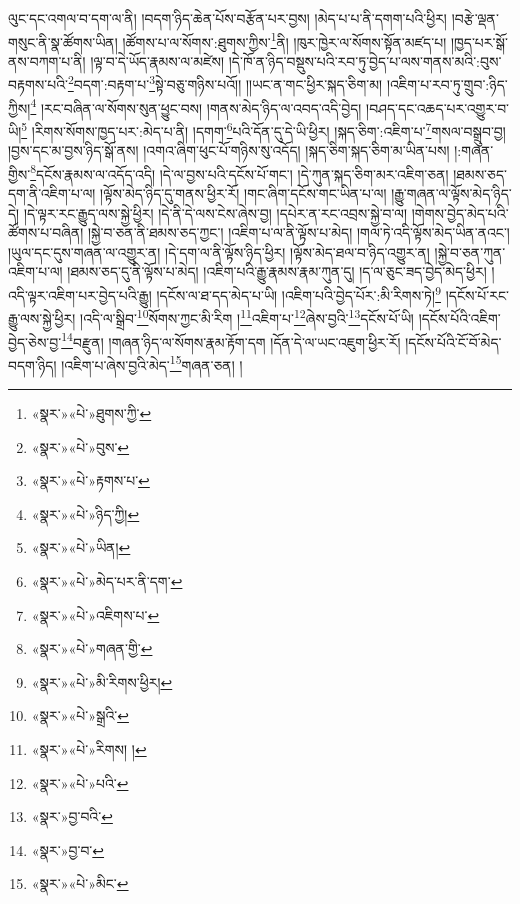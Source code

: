 ལུང་དང་འགལ་བ་དག་ལ་ནི། །བདག་ཉིད་ཆེན་པོས་བརྩོན་པར་བྱས། །མེད་པ་པ་ནི་དགག་པའི་ཕྱིར། །བརྩེ་ལྡན་གསུང་ནི་སྣ་ཚོགས་ཡིན། །ཚོགས་པ་ལ་སོགས་:ཐུགས་ཀྱིས་\footnote{«སྣར་»«པེ་»ཐུགས་ཀྱི་}ནི། །ཁུར་ཁྱེར་ལ་སོགས་སྟོན་མཛད་པ། །ཁྱད་པར་སྒོ་ནས་བཀག་པ་ནི། །ལྟ་བ་དེ་ཡོད་རྣམས་ལ་མཛེས། །དེ་ཁོ་ན་ཉིད་བསྡུས་པའི་རབ་ཏུ་བྱེད་པ་ལས་གནས་མའི་:བུས་བརྟགས་པའི་\footnote{«སྣར་»«པེ་»བུས་}བདག་:བརྟག་པ་\footnote{«སྣར་»«པེ་»རྟགས་པ་}སྟེ་བཅུ་གཉིས་པའོ།། །།ཡང་ན་གང་ཕྱིར་སྐད་ཅིག་མ། །འཇིག་པ་རབ་ཏུ་གྲུབ་:ཉིད་ཀྱིས།\footnote{«སྣར་»«པེ་»ཉིད་ཀྱི།} །རང་བཞིན་ལ་སོགས་སུན་ཕྱུང་བས། །གནས་མེད་ཉིད་ལ་འབད་འདི་བྱེད། །བཤད་དང་འཆད་པར་འགྱུར་བ་ཡི།\footnote{«སྣར་»«པེ་»ཡིན།} །རིགས་སོགས་ཁྱད་པར་:མེད་པ་ནི། །དགག་\footnote{«སྣར་»«པེ་»མེད་པར་ནི་དག་}པའི་དོན་དུ་དེ་ཡི་ཕྱིར། །སྐད་ཅིག་:འཇིག་པ་\footnote{«སྣར་»«པེ་»འཇིགས་པ་}གསལ་བསྒྲུབ་བྱ། །བྱས་དང་མ་བྱས་ཉིད་སྒོ་ནས། །འགའ་ཞིག་ཕུང་པོ་གཉིས་སུ་འདོད། །སྐད་ཅིག་སྐད་ཅིག་མ་ཡིན་པས། །:གཞན་གྱིས་\footnote{«སྣར་»«པེ་»གཞན་གྱི་}དངོས་རྣམས་ལ་འདོད་འདི། །དེ་ལ་བྱས་པའི་དངོས་པོ་གང་། །དེ་ཀུན་སྐད་ཅིག་མར་འཇིག་ཅན། །ཐམས་ཅད་དག་ནི་འཇིག་པ་ལ། །ལྟོས་མེད་ཉིད་དུ་གནས་ཕྱིར་རོ། །གང་ཞིག་དངོས་གང་ཡིན་པ་ལ། །རྒྱུ་གཞན་ལ་ལྟོས་མེད་ཉིད་དེ། །དེ་ལྟར་རང་རྒྱུད་ལས་སྐྱེ་ཕྱིར། །དེ་ནི་དེ་ལས་ངེས་ཞེས་བྱ། །དཔེར་ན་རང་འབྲས་སྐྱེ་བ་ལ། །གེགས་བྱེད་མེད་པའི་ཚོགས་པ་བཞིན། །སྐྱེ་བ་ཅན་ནི་ཐམས་ཅད་ཀྱང་། །འཇིག་པ་ལ་ནི་ལྟོས་པ་མེད། །གལ་ཏེ་འདི་ལྟོས་མེད་ཡིན་ནའང་། །ཡུལ་དང་དུས་གཞན་ལ་འགྱུར་ན། །དེ་དག་ལ་ནི་ལྟོས་ཉིད་ཕྱིར། །ལྟོས་མེད་ཐལ་བ་ཉིད་འགྱུར་ན། །སྐྱེ་བ་ཅན་ཀུན་འཇིག་པ་ལ། །ཐམས་ཅད་དུ་ནི་ལྟོས་པ་མེད། །འཇིག་པའི་རྒྱུ་རྣམས་རྣམ་ཀུན་དུ། །ད་ལ་ཅུང་ཟད་བྱེད་མེད་ཕྱིར། །འདི་ལྟར་འཇིག་པར་བྱེད་པའི་རྒྱུ། །དངོས་ལ་ཐ་དད་མེད་པ་ཡི། །འཇིག་པའི་བྱེད་པོར་:མི་རིགས་ཏེ།\footnote{«སྣར་»«པེ་»མི་རིགས་ཕྱིར།} །དངོས་པོ་རང་རྒྱུ་ལས་སྐྱེ་ཕྱིར། །འདི་ལ་སྒྲིབ་\footnote{«སྣར་»«པེ་»སྒྲའི་}སོགས་ཀྱང་མི་རིག །\footnote{«སྣར་»«པེ་»རིགས། །}འཇིག་པ་\footnote{«སྣར་»«པེ་»པའི་}ཞེས་བྱའི་\footnote{«སྣར་»བྱ་བའི་}དངོས་པོ་ཡི། །དངོས་པོའི་འཇིག་བྱེད་ཅེས་བྱ་\footnote{«སྣར་»བྱ་བ་}བརྫུན། །གཞན་ཉིད་ལ་སོགས་རྣམ་རྟོག་དག །དོན་དེ་ལ་ཡང་འཇུག་ཕྱིར་རོ། །དངོས་པོའི་ངོ་བོ་མེད་བདག་ཉིད། །འཇིག་པ་ཞེས་བྱའི་མེད་\footnote{«སྣར་»«པེ་»མིང་}གཞན་ཅན། །
